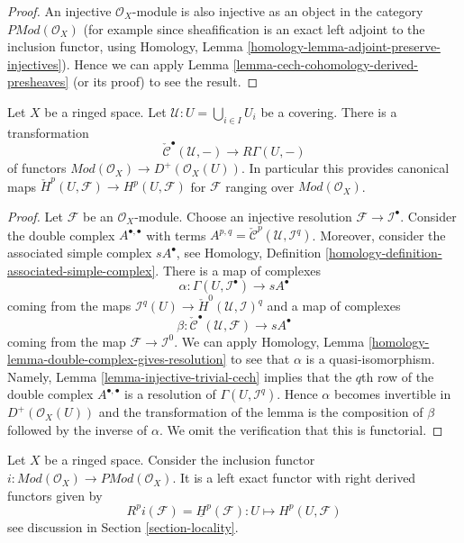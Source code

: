 \begin{proof}
An injective $\mathcal{O}_X$-module is also injective as an object in
the category $\textit{PMod}(\mathcal{O}_X)$ (for example since
sheafification is an exact left adjoint to the inclusion functor,
using Homology, Lemma \ref{homology-lemma-adjoint-preserve-injectives}).
Hence we can apply Lemma \ref{lemma-cech-cohomology-derived-presheaves}
(or its proof) to see the result.
\end{proof}

\begin{lemma}
\label{lemma-cech-cohomology}
Let $X$ be a ringed space.
Let $\mathcal{U} : U = \bigcup_{i \in I} U_i$ be a covering.
There is a transformation
$$
\check{\mathcal{C}}^\bullet(\mathcal{U}, -)
\longrightarrow
R\Gamma(U, -)
$$
of functors
$\textit{Mod}(\mathcal{O}_X) \to D^{+}(\mathcal{O}_X(U))$.
In particular this provides canonical maps
$\check{H}^p(U, \mathcal{F}) \to H^p(U, \mathcal{F})$ for
$\mathcal{F}$ ranging over $\textit{Mod}(\mathcal{O}_X)$.
\end{lemma}

\begin{proof}
Let $\mathcal{F}$ be an $\mathcal{O}_X$-module. Choose an injective resolution
$\mathcal{F} \to \mathcal{I}^\bullet$. Consider the double complex
$A^{\bullet, \bullet}$ with terms
$A^{p, q} = \check{\mathcal{C}}^p(\mathcal{U}, \mathcal{I}^q)$.
Moreover, consider the associated simple complex
$sA^\bullet$, see
Homology, Definition \ref{homology-definition-associated-simple-complex}.
There is a map of complexes
$$
\alpha :
\Gamma(U, \mathcal{I}^\bullet)
\longrightarrow
sA^\bullet
$$
coming from the maps
$\mathcal{I}^q(U) \to \check{H}^0(\mathcal{U}, \mathcal{I})^q$
and a map of complexes
$$
\beta :
\check{\mathcal{C}}^\bullet(\mathcal{U}, \mathcal{F})
\longrightarrow
sA^\bullet
$$
coming from the map $\mathcal{F} \to \mathcal{I}^0$.
We can apply
Homology, Lemma \ref{homology-lemma-double-complex-gives-resolution}
to see that $\alpha$ is a quasi-isomorphism.
Namely, Lemma \ref{lemma-injective-trivial-cech} implies that
the $q$th row of the double complex $A^{\bullet, \bullet}$ is a
resolution of $\Gamma(U, \mathcal{I}^q)$.
Hence $\alpha$ becomes invertible in $D^{+}(\mathcal{O}_X(U))$ and
the transformation of the lemma is the composition of $\beta$
followed by the inverse of $\alpha$. We omit the verification
that this is functorial.
\end{proof}

\begin{lemma}
\label{lemma-include}
Let $X$ be a ringed space.
Consider the inclusion functor
$i : \textit{Mod}(\mathcal{O}_X) \to \textit{PMod}(\mathcal{O}_X)$.
It is a left exact functor with right derived functors given by
$$
R^pi(\mathcal{F}) = \underline{H}^p(\mathcal{F}) :
U \longmapsto H^p(U, \mathcal{F})
$$
see discussion in Section \ref{section-locality}.
\end{lemma}

